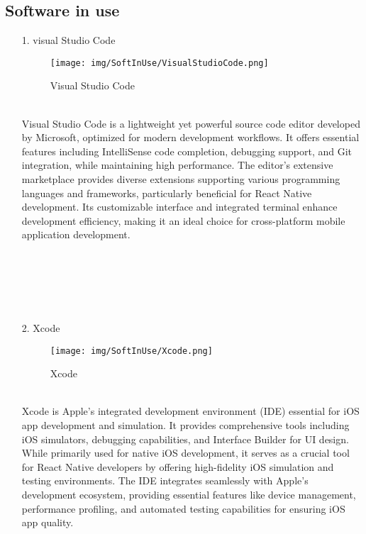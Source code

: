 \documentclass[conference]{IEEEtran}
\begin{document}
\subsection{Software in use}
\begin{enumerate}
\item[1.] visual Studio Code
\begin{figure}[h]
\hspace{1cm}
\centering
\begin{minipage}{0.4\columnwidth}
    \texttt{[image: img/SoftInUse/VisualStudioCode.png]}
    \caption{Visual Studio Code}
\end{minipage}
\end{figure}\\
Visual Studio Code is a lightweight yet powerful source code editor developed by Microsoft, optimized for modern development workflows. It offers essential features including IntelliSense code completion, debugging support, and Git integration, while maintaining high performance. The editor's extensive marketplace provides diverse extensions supporting various programming languages and frameworks, particularly beneficial for React Native development. Its customizable interface and integrated terminal enhance development efficiency, making it an ideal choice for cross-platform mobile application development.
\\ \\ \\ \\ \\ \\

\item[2.] Xcode
\begin{figure}[h]
\hspace{1.5cm}
\centering
\begin{minipage}{0.4\columnwidth}
    \texttt{[image: img/SoftInUse/Xcode.png]}
    \caption{Xcode}
\end{minipage}
\end{figure}\\
Xcode is Apple's integrated development environment (IDE) essential for iOS app development and simulation. It provides comprehensive tools including iOS simulators, debugging capabilities, and Interface Builder for UI design. While primarily used for native iOS development, it serves as a crucial tool for React Native developers by offering high-fidelity iOS simulation and testing environments. The IDE integrates seamlessly with Apple's development ecosystem, providing essential features like device management, performance profiling, and automated testing capabilities for ensuring iOS app quality.\\


\end{enumerate}
\end{document}

